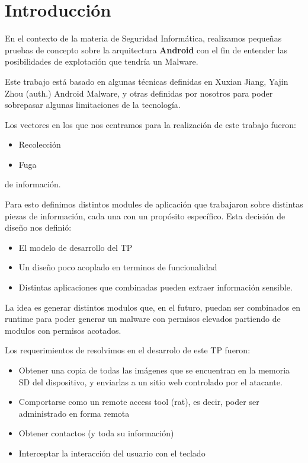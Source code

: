 \section{Introducci\'on}
En el contexto de la materia de Seguridad Inform\'atica, realizamos peque\~nas pruebas de concepto sobre la arquitectura \textbf{Android} con el fin de entender las posibilidades de explotaci\'on que tendr\'ia un Malware.

Este trabajo est\'a basado en algunas t\'ecnicas definidas en Xuxian Jiang,  Yajin Zhou  (auth.) Android Malware, y otras definidas por nosotros para poder sobrepasar algunas limitaciones de la tecnolog\'ia.

Los vectores en los que nos centramos para la realizaci\'on de este trabajo fueron:

\begin{itemize}
    \item Recolecci\'on 
    \item Fuga
\end{itemize}

de informaci\'on.

Para esto definimos distintos modules de aplicaci\'on que trabajaron sobre distintas piezas de informaci\'on, cada una con un prop\'osito espec\'ifico. Esta decisi\'on de dise\~no nos defini\'o:

\begin{itemize}
    \item El modelo de desarrollo del TP
    \item Un dise\~no poco acoplado en terminos de funcionalidad
    \item Distintas aplicaciones que combinadas pueden extraer informaci\'on sensible.
\end{itemize}


La idea es generar distintos modulos que, en el futuro, puedan ser combinados en runtime para poder generar un malware con permisos elevados partiendo de modulos con permisos acotados.


Los requerimientos de resolvimos en el desarrolo de este TP fueron:
\begin{itemize}
    \item Obtener una copia de todas las im\'agenes que se encuentran en la memoria SD del dispositivo, y enviarlas a un sitio web controlado por el atacante.
    \item  Comportarse como un remote access tool (rat), es decir, poder ser administrado en forma remota
    \item  Obtener contactos (y toda su información)
    \item  Interceptar la interacci\'on del usuario con el teclado
\end{itemize}

